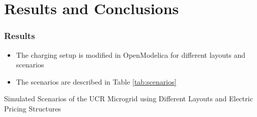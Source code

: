\documentclass[aspectratio=169, 8 pt]{beamer}
\begin{document}
\section{Results and Conclusions}	
		\begin{frame}
			\frametitle{Results}
			\begin{itemize}
				\item The charging setup is modified in OpenModelica for different layouts and scenarios
				\item The scenarios are described in Table \ref{tab:scenarios}
			\end{itemize}
			
			\begin{table}
				\caption{Simulated Scenarios of the UCR Microgrid using Different Layouts and Electric Pricing Structures}
				\large
				
				\label{tab:scenarios}
			\end{table}
		\end{frame}
	
\end{document}
